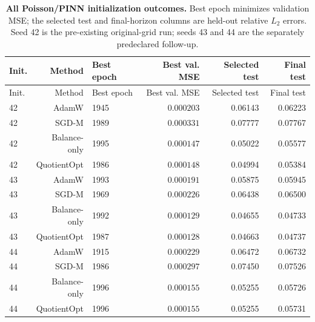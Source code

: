\begin{longtable}{@{}lrlrrr@{}}
\caption{\textbf{All Poisson/PINN initialization outcomes.} Best epoch minimizes validation MSE; the selected test and final-horizon columns are held-out relative $L_2$ errors. Seed 42 is the pre-existing original-grid run; seeds 43 and 44 are the separately predeclared follow-up.}\label{tab:poisson-initialization-all}\\
\toprule Init. & Method & Best epoch & Best val. MSE & Selected test & Final test \\ \midrule\endfirsthead
\toprule Init. & Method & Best epoch & Best val. MSE & Selected test & Final test \\ \midrule\endhead
42 & AdamW & 1945 & $0.000203$ & 0.06143 & 0.06223\\
42 & SGD-M & 1989 & $0.000331$ & 0.07777 & 0.07767\\
42 & Balance-only & 1995 & $0.000147$ & 0.05022 & 0.05577\\
\rowcolor{oursbg}42 & QuotientOpt & 1986 & $0.000148$ & 0.04994 & 0.05384\\
43 & AdamW & 1993 & $0.000191$ & 0.05875 & 0.05945\\
43 & SGD-M & 1969 & $0.000226$ & 0.06438 & 0.06500\\
43 & Balance-only & 1992 & $0.000129$ & 0.04655 & 0.04733\\
\rowcolor{oursbg}43 & QuotientOpt & 1987 & $0.000128$ & 0.04663 & 0.04737\\
44 & AdamW & 1915 & $0.000229$ & 0.06472 & 0.06732\\
44 & SGD-M & 1986 & $0.000297$ & 0.07450 & 0.07526\\
44 & Balance-only & 1996 & $0.000155$ & 0.05255 & 0.05726\\
\rowcolor{oursbg}44 & QuotientOpt & 1996 & $0.000155$ & 0.05255 & 0.05731\\
\bottomrule
\end{longtable}
